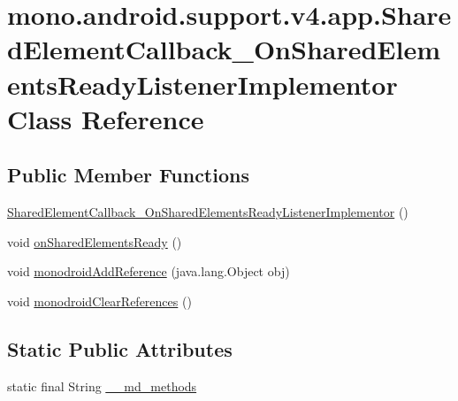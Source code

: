 \hypertarget{classmono_1_1android_1_1support_1_1v4_1_1app_1_1_shared_element_callback___on_shared_elements_ready_listener_implementor}{
\section{mono.android.support.v4.app.SharedElementCallback\_\-OnSharedElementsReadyListenerImplementor Class Reference}
\label{classmono_1_1android_1_1support_1_1v4_1_1app_1_1_shared_element_callback___on_shared_elements_ready_listener_implementor}
}
\subsection*{Public Member Functions}
\begin{CompactItemize}
\item 
\hyperlink{classmono_1_1android_1_1support_1_1v4_1_1app_1_1_shared_element_callback___on_shared_elements_ready_listener_implementor_a0c1bbd941448c3da43cbec63f53ae7d}{SharedElementCallback\_\-OnSharedElementsReadyListenerImplementor} ()
\item 
void \hyperlink{classmono_1_1android_1_1support_1_1v4_1_1app_1_1_shared_element_callback___on_shared_elements_ready_listener_implementor_1c76f286348f96d584d4ca5cb7f7ae91}{onSharedElementsReady} ()
\item 
void \hyperlink{classmono_1_1android_1_1support_1_1v4_1_1app_1_1_shared_element_callback___on_shared_elements_ready_listener_implementor_0c23882816bc9a3c60a20b6b78ddcecd}{monodroidAddReference} (java.lang.Object obj)
\item 
void \hyperlink{classmono_1_1android_1_1support_1_1v4_1_1app_1_1_shared_element_callback___on_shared_elements_ready_listener_implementor_d09c450b8d36eac5011c443f7ef17dbd}{monodroidClearReferences} ()
\end{CompactItemize}
\subsection*{Static Public Attributes}
\begin{CompactItemize}
\item 
static final String \hyperlink{classmono_1_1android_1_1support_1_1v4_1_1app_1_1_shared_element_callback___on_shared_elements_ready_listener_implementor_23f34ccac6fe95f25d35d1a3d4f1c957}{\_\-\_\-md\_\-methods}
\end{CompactItemize}
